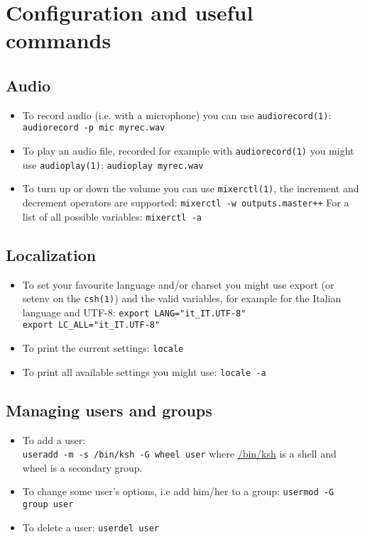 \documentclass[notumble]{leaflet}
\newcommand{\man}[1]{\mbox{\texttt{#1}}}
\begin{document}
\section{Configuration and useful commands}
\subsection{Audio}
\begin{itemize}
\item To record audio (i.e. with a microphone) you can use
\man{audiorecord(1)}: \verb|audiorecord -p mic myrec.wav|
\item To play an audio file, recorded for example with
\man{audiorecord(1)} you might use \man{audioplay(1)}:
\verb|audioplay myrec.wav|
\item To turn up or down the volume you can use \man{mixerctl(1)},
the increment and decrement operators are supported:
\verb|mixerctl -w outputs.master++|
For a list of all possible variables:
\verb|mixerctl -a|
\end{itemize}

\subsection{Localization}
\begin{itemize}
\item To set your favourite language and/or charset you might use \mbox{export}
(or \mbox{setenv} on the \man{csh(1)}) and the valid variables, for example for
the Italian language and \mbox{UTF-8}:
\verb|export LANG="it_IT.UTF-8"| \\
\verb|export LC_ALL="it_IT.UTF-8"|
\item To print the current settings:
\verb|locale|
\item To print all available settings you might use:
\verb|locale -a|
\end{itemize}

\subsection{Managing users and groups}
\begin{itemize}
\item To add a user: \\
\verb|useradd -m -s /bin/ksh -G wheel user|
where \url{/bin/ksh} is a shell and \mbox{wheel} is a secondary group.
\item To change some user's options, i.e add him/her to a group:
\verb|usermod -G group user|
\item To delete a user: \verb|userdel user|
\end{itemize}
\end{document}
